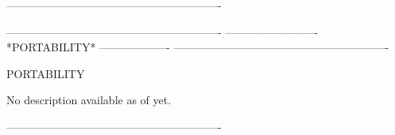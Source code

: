 ----------------------------------------------------------
 
 
 
 
 
 
 
 
 
 
 
 
 
 
 
 
 
 
 
 
 
 
 
 
 
 
 
 
 
 
 
 
 
 
 
 
 
 
 
 
 
 
 
 
 
 
 
 
 
 
 
 
 
 
 
 
 
 
 
 
 
 
 
 
 
 
 
 
 
 
 
 
 
 
 
 
 
 
 
 
 
 
 
 
 
 
 
 
 
 
----------------------------------------------------------
-------------------------  *PORTABILITY*  -------------------
----------------------------------------------------------
 
PORTABILITY
 
 
No description available as of yet.
 
----------------------------------------------------------
 
 
 
 
 
 
 
